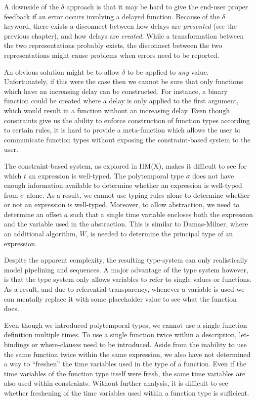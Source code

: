 A downside of the $\delta$ approach is that it may be hard to give the end-user proper feedback if an error occurs involving a delayed function.
Because of the $\delta$ keyword, there exists a disconnect between how delays are \textit{presented} (see the previous chapter), and how delays are \textit{created}.
While a transformation between the two representations probably exists, the disconnect between the two representations might cause problems when errors need to be reported.

An obvious solution might be to allow $\delta$ to be applied to \textit{any} value.
Unfortunately, if this were the case then we cannot be sure that only functions which have an increasing delay can be constructed.
For instance, a binary function could be created where a delay is only applied to the first argument, which would result in a function without an increasing delay.
Even though constraints give us the ability to enforce construction of function types according to certain rules, it is hard to provide a meta-function which allows the user to communicate function types without exposing the constraint-based system to the user.

The constraint-based system, as explored in HM(X)\cite{odersky1999type}, makes it difficult to see for which $t$ an expression is well-typed.
The polytemporal type $\sigma$ does not have enough information available to determine whether an expression is well-typed from $\sigma$ alone.
As a result, we cannot use typing rules alone to determine whether or not an expression is well-typed.
Moreover, to allow abstraction, we need to determine an offset $a$ such that a single time variable encloses both the expression and the variable used in the abstraction.
This is similar to Damas-Milner, where an additional algorithm, $W$, is needed to determine the principal type of an expression.

Despite the apparent complexity, the resulting type-system can only realistically model pipelining and sequences.
A major advantage of the type system however, is that the type system only allows variables to refer to single values or functions.
As a result, and due to referential transparency, whenever a variable is used we can mentally replace it with some placeholder value to see what the function does.

Even though we introduced polytemporal types, we cannot use a single function definition multiple times.
To use a single function twice within a description, let-bindings or where-clauses need to be introduced.
Aside from the inability to use the same function twice within the same expression, we also have not determined a way to ``freshen'' the time variables used in the type of a function.
Even if the time variables of the function type itself were fresh, the same time variables are also used within constraints.
Without further analysis, it is difficult to see whether freshening of the time variables used within a function type is sufficient.

